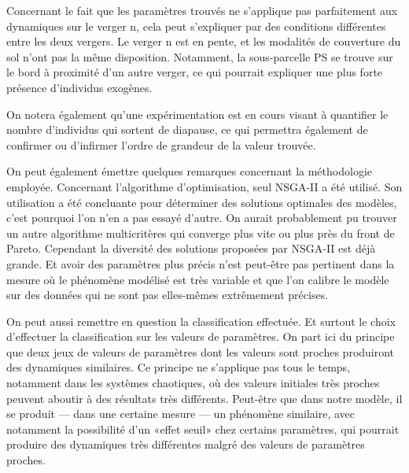 Concernant le fait que les paramètres trouvés ne s'applique pas parfaitement aux dynamiques sur le verger n, cela peut s'expliquer par des conditions différentes entre les deux vergers.
Le verger n est en pente, et les modalités de couverture du sol n'ont pas la même disposition.
Notamment, la sous-parcelle PS se trouve sur le bord à proximité d'un autre verger, ce qui pourrait expliquer une plus forte présence d'individus exogènes.

On notera également qu'une expérimentation est en cours visant à quantifier le nombre d'individus qui sortent de diapause, ce qui permettra également de confirmer ou d'infirmer l'ordre de grandeur de la valeur trouvée.


On peut également émettre quelques remarques concernant la méthodologie employée.
Concernant l'algorithme d'optimisation, seul NSGA-II a été utilisé.
Son utilisation a été concluante pour déterminer des solutions optimales des modèles, c'est pourquoi l'on n'en a pas essayé d'autre.
On aurait probablement pu trouver un autre algorithme multicritères qui converge plus vite ou plus près du front de Pareto.
Cependant la diversité des solutions proposées par NSGA-II est déjà grande.
Et avoir des paramètres plus précis n'est peut-être pas pertinent dans la mesure où le phénomène modélisé est très variable et que l'on calibre le modèle sur des données qui ne sont pas elles-mêmes extrêmement précises.

On peut aussi remettre en question la classification effectuée.
Et surtout le choix d'effectuer la classification sur les valeurs de paramètres.
On part ici du principe que deux jeux de valeurs de paramètres dont les valeurs sont proches produiront des dynamiques similaires.
Ce principe ne s'applique pas tous le temps, notamment dans les systèmes chaotiques, où des valeurs initiales très proches peuvent aboutir à des résultats très différents.
Peut-être que dans notre modèle, il se produit --- dans une certaine mesure --- un phénomène similaire, avec notamment la possibilité d'un «effet seuil» chez certains paramètres, qui pourrait produire des dynamiques très différentes malgré des valeurs de paramètres proches.
